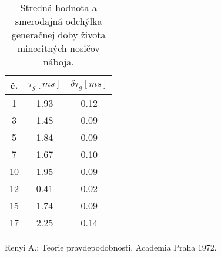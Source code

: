 \begin{table}[h!]\centering
  \begin{tabular}{c c c}
    č. & ${\bar{\tau_{g}}}[ms]$ & $\delta\tau_{g}[ms]$\\ 
    \hline
     1 & 1.93 & 0.12\\
     3 & 1.48 & 0.09\\
     5 & 1.84 & 0.09\\
     7 & 1.67 & 0.10\\
    10 & 1.95 & 0.09\\
    12 & 0.41 & 0.02\\
    15 & 1.74 & 0.09\\
    17 & 2.25 & 0.14\\
  \end{tabular}
  \caption[Stredná hodnota a smerodajná odchýlka generačnej doby
    života minoritných nosičov náboja]{Stredná hodnota a smerodajná
    odchýlka generačnej doby života minoritných nosičov
    náboja.}\label{tab:7.6}
\end{table}


\begin{thebibliography}{}
  Renyi A.: Teorie pravdepodobnosti. Academia Praha 1972.
\end{thebibliography}
